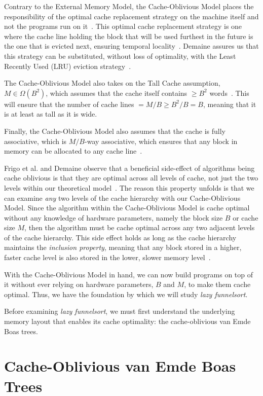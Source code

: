 \documentclass[11pt, letterpaper]{article}
\begin{document}
Contrary to the External Memory Model, the Cache-Oblivious Model places the responsibility of the optimal cache replacement strategy on the machine itself and not the programs run on it~\cite{demaine}. This optimal cache replacement strategy is one where the cache line holding the block that will be used furthest in the future is the one that is evicted next, ensuring temporal locality~\cite{demaine}. Demaine assures us that this strategy can be substituted, without loss of optimality, with the Least Recently Used (LRU) eviction strategy~\cite{demaine}. 

The Cache-Oblivious Model also takes on the Tall Cache assumption, $M \in \Omega(B^2)$, which assumes that the cache itself contains $\ge B^2$ words~\cite{demaine}. This will ensure that the number of cache lines $= M/B \ge B^2/B = B$, meaning that it is at least as tall as it is wide. 

Finally, the Cache-Oblivious Model also assumes that the cache is fully associative, which is $M/B$-way associative, which ensures that any block in memory can be allocated to any cache line~\cite{demaine}. 

Frigo et al. and Demaine observe that a beneficial side-effect of algorithms being cache oblivious is that they are optimal across all levels of cache, not just the two levels within our theoretical model~\cite{frigo,demaine}. The reason this property unfolds is that we can examine \textit{any} two levels of the cache hierarchy with our Cache-Oblivious Model. Since the algorithm within the Cache-Oblivious Model is cache optimal without any knowledge of hardware parameters, namely the block size $B$ or cache size $M$, then the algorithm must be cache optimal across any two adjacent levels of the cache hierarchy. This side effect holds as long as the cache hierarchy maintains the \textit{inclusion property}, meaning that any block stored in a higher, faster cache level is also stored in the lower, slower memory level~\cite{frigo,demaine}.

With the Cache-Oblivious Model in hand, we can now build programs on top of it without ever relying on hardware parameters, $B$ and $M$, to make them cache optimal. Thus, we have the foundation by which we will study \textit{lazy funnelsort}.

Before examining \textit{lazy funnelsort}, we must first understand the underlying memory layout that enables its cache optimality: the cache-oblivious van Emde Boas trees.

\section{Cache-Oblivious van Emde Boas Trees}
\end{document}
